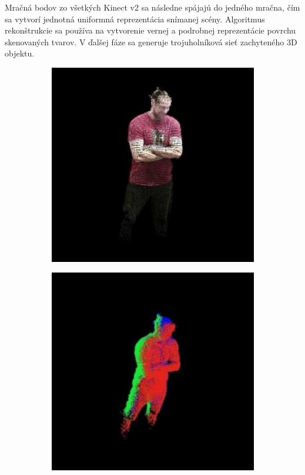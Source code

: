 Mračná bodov zo všetkých Kinect v2 sa následne spájajú do jedného mračna, čím sa vytvorí jednotná uniformná reprezentácia snímanej scény. Algoritmus rekonštrukcie sa používa na vytvorenie vernej a podrobnej reprezentácie povrchu skenovaných tvarov. V ďalšej fáze sa generuje trojuholníková sieť zachyteného 3D objektu. 


\begin{figure}[H]
	\centering
	\begin{subfigure}[b]{0.32\textwidth}
		\centering
		\includegraphics[width=\textwidth]{figures/resers_r.png}
		\caption{}
		\label{fig:resers:r}
	\end{subfigure}
	\hfill
	\begin{subfigure}[b]{0.315\textwidth}
		\centering
		\includegraphics[width=\textwidth]{figures/resers_s.png}

\end{subfigure}
\end{figure}
